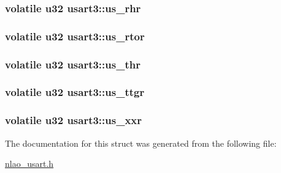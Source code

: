 \label{structusart3_a0a4d6691f4ac9773723886d34188a6f4}
\hypertarget{structusart3_a8e4195718c8440c67bff3ae34660d8f1}{
\subsubsection[{us\-\_\-rhr}]{\setlength{\rightskip}{0pt plus 5cm}volatile {\bf u32} {\bf usart3\-::us\-\_\-rhr}}}
\label{structusart3_a8e4195718c8440c67bff3ae34660d8f1}
\hypertarget{structusart3_a018e775f13ee0a5c230dcce9d3b46752}{
\subsubsection[{us\-\_\-rtor}]{\setlength{\rightskip}{0pt plus 5cm}volatile {\bf u32} {\bf usart3\-::us\-\_\-rtor}}}
\label{structusart3_a018e775f13ee0a5c230dcce9d3b46752}
\hypertarget{structusart3_ae16d91cac7892c6780881bd6e347204f}{
\subsubsection[{us\-\_\-thr}]{\setlength{\rightskip}{0pt plus 5cm}volatile {\bf u32} {\bf usart3\-::us\-\_\-thr}}}
\label{structusart3_ae16d91cac7892c6780881bd6e347204f}
\hypertarget{structusart3_afe2a8ef5588e54c1b59c3216ab901961}{
\subsubsection[{us\-\_\-ttgr}]{\setlength{\rightskip}{0pt plus 5cm}volatile {\bf u32} {\bf usart3\-::us\-\_\-ttgr}}}
\label{structusart3_afe2a8ef5588e54c1b59c3216ab901961}
\hypertarget{structusart3_a82ac88a3a7c633e8343620baba7f990e}{
\subsubsection[{us\-\_\-xxr}]{\setlength{\rightskip}{0pt plus 5cm}volatile {\bf u32} {\bf usart3\-::us\-\_\-xxr}}}
\label{structusart3_a82ac88a3a7c633e8343620baba7f990e}


\-The documentation for this struct was generated from the following file\-:\begin{DoxyCompactItemize}
\item 
\hyperlink{nlao__usart_8h}{nlao\-\_\-usart.\-h}\end{DoxyCompactItemize}
